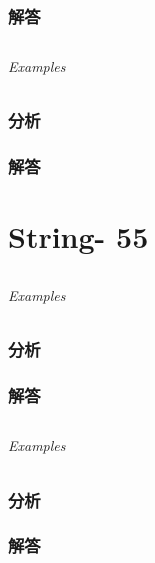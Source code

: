 \documentclass[UTF8,a4paper,12pt]{ctexbook}
\begin{document}
	\subsection{解答}
	
\section{}
	
	\subparagraph{Examples}
	
	\subsection{分析}
	
	\subsection{解答}
\chapter{String- 55}
	
\section{}
	
	\subparagraph{Examples}
	
	\subsection{分析}
	
	\subsection{解答}
	
\section{}
	
	\subparagraph{Examples}
	
	\subsection{分析}
	
	\subsection{解答}
	
	
\section{}
	
\end{document}
